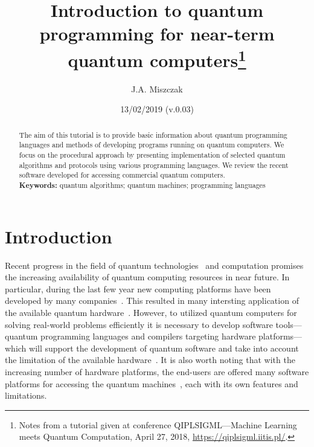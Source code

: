 \documentclass[a4paper,11pt]{article}
\newcommand{\docName}{tutorial\xspace}
\begin{document}
\title{Introduction to quantum programming for near-term quantum 
computers\footnote{Notes from a tutorial given 
at conference QIPLSIGML---Machine Learning meets Quantum Computation, April 27, 
2018, \url{https://qiplsigml.iitis.pl/}.}}
\author{J.A. Miszczak}
\date{13/02/2019 (v.0.03)}

\maketitle

\begin{abstract}
The aim of this \docName is to provide basic information about quantum
programming languages and methods of developing programs running on quantum
computers. We focus on the procedural approach by presenting implementation
of selected quantum algorithms and protocols using various programming
languages. We review the recent software developed for accessing commercial
quantum computers.\\[6pt]
\textbf{Keywords:} quantum algorithms; quantum machines; programming languages
\end{abstract}

\section{Introduction}
Recent progress in the field of quantum technologies~\cite{gyongyosi2019survey} 
and computation promises the increasing availability of quantum 
computing 
resources in near future. In particular, during the last few year new 
computing platforms have been developed by many 
companies~\cite{ibm-quantumexperience}. This resulted in many intersting 
application of the available quantum hardware~\cite{xandu-pennylane}. 
However, to utilized quantum computers for solving real-world problems 
efficiently it is necessary to develop software tools---quantum programming 
languages and compilers targeting hardware platforms---which will support the 
development of quantum software and take into account the limitation of the 
available hardware~\cite{chong2017programming}. It is also worth noting that 
with the increasing number of hardware platforms, the end-users are offered 
many software platforms for accessing the quantum 
machines~\cite{larose2018overview}, each with its own features and limitations.
\end{document}
